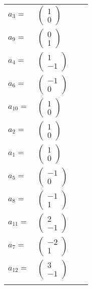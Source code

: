 \documentclass[1p]{elsarticle_modified}
\theoremstyle{definition}
\begin{document}
\begin{tabular}{m{7pt} m{180pt} m{7pt} m{180pt} }
\flushright $a_{3}=$&$\begin{pmatrix}1\\0\end{pmatrix}$ \\
\flushright $a_{9}=$&$\begin{pmatrix}0\\1\end{pmatrix}$ \\
\flushright $a_{4}=$&$\begin{pmatrix}1\\-1\end{pmatrix}$ \\
\flushright $a_{6}=$&$\begin{pmatrix}-1\\0\end{pmatrix}$ \\
\flushright $a_{10}=$&$\begin{pmatrix}1\\0\end{pmatrix}$ \\
\flushright $a_{2}=$&$\begin{pmatrix}1\\0\end{pmatrix}$ \\
\flushright $a_{1}=$&$\begin{pmatrix}1\\0\end{pmatrix}$ \\
\flushright $a_{5}=$&$\begin{pmatrix}-1\\0\end{pmatrix}$ \\
\flushright $a_{8}=$&$\begin{pmatrix}-1\\1\end{pmatrix}$ \\
\flushright $a_{11}=$&$\begin{pmatrix}2\\-1\end{pmatrix}$ \\
\flushright $a_{7}=$&$\begin{pmatrix}-2\\1\end{pmatrix}$ \\
\flushright $a_{12}=$&$\begin{pmatrix}3\\-1\end{pmatrix}$\\&\end{tabular}
\end{document}

